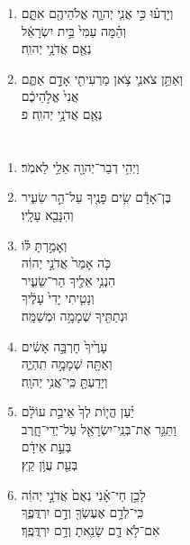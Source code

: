 \documentclass[12pt,a4paper,titlepage]{article}
\def \pscolor{red} %
\def \pslabelsep{0.3em} %
\def \psleftmargin{1em} %
\begin{document}
\begin{hebrew}
\begin{enumerate}[leftmargin=\psleftmargin, labelsep=\pslabelsep, label=\fontspec{Linux Libertine}\arabic*, font=\color{\pscolor}\small\textsuperscript, parsep=0em, itemsep=0em, topsep=0em]
    \item וְיָדְע֗וּ כִּ֣י אֲנִ֧י יְהוָ֛ה אֱלֹהֵיהֶ֖ם אִתָּ֑ם \\ וְהֵ֗מָּה עַמִּי֙ בֵּ֣ית יִשְׂרָאֵ֔ל \\ נְאֻ֖ם אֲדֹנָ֥י יְהוִֽה׃
    \item וְאַתֵּ֥ן צֹאנִ֛י צֹ֥אן מַרְעִיתִ֖י אָדָ֣ם אַתֶּ֑ם \\ אֲנִי֙ אֱלֹ֣הֵיכֶ֔ם \\ נְאֻ֖ם אֲדֹנָ֥י יְהוִֽה׃ פ
  \end{enumerate}
  \newpage

  \subsection*{}
  \section*{}
  \vspace{-0.62mm}
  \begin{enumerate}[leftmargin=\psleftmargin, labelsep=\pslabelsep, label=\fontspec{Linux Libertine}\arabic*, font=\color{\pscolor}\small\textsuperscript, parsep=0em, itemsep=0em, topsep=0em]
    \item וַיְהִ֥י דְבַר־יְהוָ֖ה אֵלַ֥י לֵאמֹֽר׃
    \item בֶּן־אָדָ֕ם שִׂ֥ים פָּנֶ֖יךָ עַל־הַ֣ר שֵׂעִ֑יר \\ וְהִנָּבֵ֖א עָלָֽיו׃
    \item וְאָמַ֣רְתָּ לּ֗וֹ\\  כֹּ֤ה אָמַר֙ אֲדֹנָ֣י יְהוִ֔ה \\ הִנְנִ֥י אֵלֶ֖יךָ הַר־שֵׂעִ֑יר \\ וְנָטִ֤יתִי יָדִי֙ עָלֶ֔יךָ \\ וּנְתַתִּ֖יךָ שְׁמָמָ֥ה וּמְשַׁמָּֽה׃
    \item עָרֶ֙יךָ֙ חָרְבָּ֣ה אָשִׂ֔ים \\ וְאַתָּ֖ה שְׁמָמָ֣ה תִֽהְיֶ֑ה \\ וְיָדַעְתָּ֖ כִּֽי־אֲנִ֥י יְהוָֽה׃
    \item יַ֗עַן הֱי֤וֹת לְךָ֙ אֵיבַ֣ת עוֹלָ֔ם \\ וַתַּגֵּ֥ר אֶת־בְּנֵֽי־יִשְׂרָאֵ֖ל עַל־יְדֵי־חָ֑רֶב \\ בְּעֵ֣ת אֵידָ֔ם \\ בְּעֵ֖ת עֲוֹ֥ן קֵֽץ׃
    \item לָכֵ֣ן חַי־אָ֗נִי נְאֻם֙ אֲדֹנָ֣י יְהוִ֔ה \\ כִּֽי־לְדָ֥ם אֶעֶשְׂךָ֖ וְדָ֣ם יִרְדֲּפֶ֑ךָ \\ אִם־לֹ֥א דָ֛ם שָׂנֵ֖אתָ וְדָ֥ם יִרְדֲּפֶֽךָ׃

\end{enumerate}
\end{hebrew}
\end{document}
